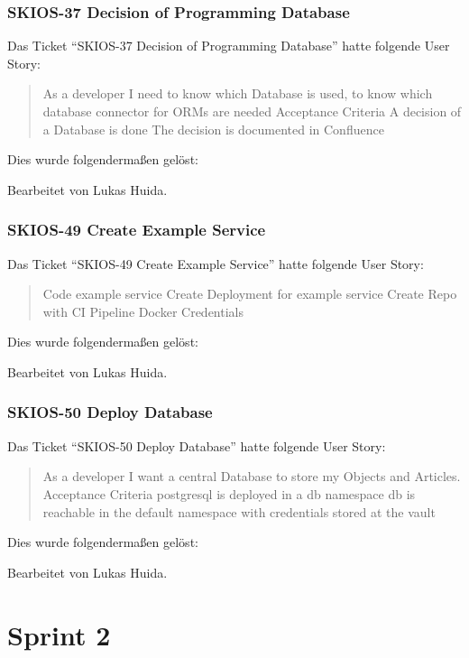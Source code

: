 \subsubsection{SKIOS-37 Decision of Programming Database}
Das Ticket \enquote{SKIOS-37 Decision of Programming Database} hatte folgende User Story:
\begin{quotation}
    As a developer I need to know which Database is used, to know which database connector for ORMs are needed
    Acceptance Criteria
    A decision of a Database is done
    The decision is documented in Confluence
\end{quotation}
Dies wurde folgendermaßen gelöst:
\begin{quotation}
    
\end{quotation}
Bearbeitet von Lukas Huida.

\subsubsection{SKIOS-49 Create Example Service}
Das Ticket \enquote{SKIOS-49 Create Example Service} hatte folgende User Story:
\begin{quotation}
    Code example service
    Create Deployment for example service
    Create Repo with CI Pipeline
    Docker Credentials
\end{quotation}
Dies wurde folgendermaßen gelöst:
\begin{quotation}
    
\end{quotation}
Bearbeitet von Lukas Huida.

\subsubsection{SKIOS-50 Deploy Database}
Das Ticket \enquote{SKIOS-50 Deploy Database} hatte folgende User Story:
\begin{quotation}
    As a developer I want a central Database to store my Objects and Articles.
    Acceptance Criteria
    postgresql is deployed in a db namespace
    db is reachable in the default namespace with credentials stored at the vault
\end{quotation}
Dies wurde folgendermaßen gelöst:
\begin{quotation}
    
\end{quotation}
Bearbeitet von Lukas Huida.

\section{Sprint 2}
